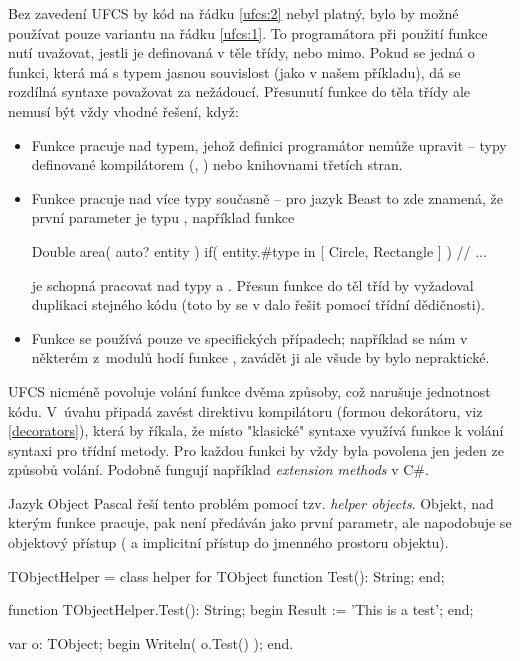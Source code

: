 Bez zavedení UFCS by kód na řádku \ref{ufcs:2} nebyl platný, bylo by možné používat pouze variantu na řádku \ref{ufcs:1}. To programátora při použití funkce nutí uvažovat, jestli je definovaná v těle třídy, nebo mimo. Pokud se jedná o funkci, která má s typem jasnou souvislost (jako v našem příkladu), dá se rozdílná syntaxe považovat za nežádoucí. Přesunutí funkce do těla třídy ale nemusí být vždy vhodné řešení, když:
\begin{itemize}
	\item Funkce pracuje nad typem, jehož definici programátor nemůže upravit -- typy definované kompilátorem (, ) nebo knihovnami třetích stran.
	\item Funkce pracuje nad více typy současně --  pro jazyk Beast to zde znamená, že první parameter je typu , například funkce
	
		\begin{code}
Double area( auto? entity )
	if( entity.#type in [ Circle, Rectangle ] )
{
	// ...
}
		\end{code}
		je schopná pracovat nad typy  a . Přesun funkce do těl tříd by vyžadoval duplikaci stejného kódu (toto by se v dalo řešit pomocí třídní dědičnosti).
	\item Funkce se používá pouze ve specifických případech; například se nám v některém z~modulů hodí funkce , zavádět ji ale všude by bylo nepraktické.
\end{itemize}

UFCS nicméně povoluje volání funkce dvěma způsoby, což narušuje jednotnost kódu. V~úvahu připadá zavést direktivu kompilátoru (formou dekorátoru, viz \autoref{decorators}), která by říkala, že místo "klasické" syntaxe využívá funkce k volání syntaxi pro třídní metody. Pro každou funkci by vždy byla povolena jen jeden ze způsobů volání. Podobně fungují například \textit{extension methods} v C\#.

Jazyk Object Pascal řeší tento problém pomocí tzv. \textit{helper objects}. Objekt, nad kterým funkce pracuje, pak není předáván jako první parametr, ale napodobuje se objektový přístup ( a implicitní přístup do jmenného prostoru objektu).
\begin{pascalcode}
TObjectHelper = class helper for TObject
	function Test(): String;
end;

function TObjectHelper.Test(): String;
begin
	Result := 'This is a test';
end;

var
	o: TObject;
begin
	Writeln( o.Test() );
end.
\end{pascalcode}

